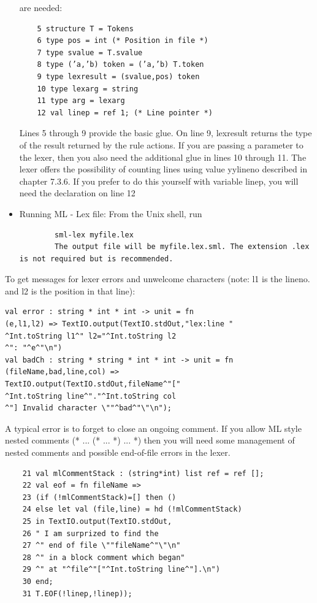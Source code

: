 \documentclass[8pt, a4paper, oneside, twocolumn]{extarticle}
\begin{document}
\begin{itemize}
    are needed:
    \begin{verbatim}
    5 structure T = Tokens
    6 type pos = int (* Position in file *)
    7 type svalue = T.svalue
    8 type (’a,’b) token = (’a,’b) T.token
    9 type lexresult = (svalue,pos) token
    10 type lexarg = string
    11 type arg = lexarg
    12 val linep = ref 1; (* Line pointer *)
    \end{verbatim}
    Lines 5 through 9 provide the basic glue. On line 9, lexresult returns the type of the
result returned by the rule actions.
If you are passing a parameter to the lexer, then you also need the additional glue
in lines 10 through 11. The lexer offers the possibility of counting lines using value yylineno described in
chapter 7.3.6. If you prefer to do this yourself with variable linep, you will need the
declaration on line 12
    \item Running ML - Lex file: From the Unix shell, run \begin{verbatim} 
        sml-lex myfile.lex 
        The output file will be myfile.lex.sml. The extension .lex is not required but is recommended. 
    \end{verbatim}
\end{itemize}

To get messages for lexer errors and unwelcome characters (note: l1 is the lineno. and l2 is the position in that line):
\begin{verbatim}
val error : string * int * int -> unit = fn
(e,l1,l2) => TextIO.output(TextIO.stdOut,"lex:line "
^Int.toString l1^" l2="^Int.toString l2
^": "^e^"\n")
val badCh : string * string * int * int -> unit = fn
(fileName,bad,line,col) =>
TextIO.output(TextIO.stdOut,fileName^"["
^Int.toString line^"."^Int.toString col
^"] Invalid character \""^bad^"\"\n");
\end{verbatim}

A typical error is to
forget to close an ongoing comment. If you allow ML style nested comments (* ... (*
... *) ... *) then you will need some management of nested comments and possible
end-of-file errors in the lexer. 
\begin{verbatim}
    21 val mlCommentStack : (string*int) list ref = ref [];
    22 val eof = fn fileName =>
    23 (if (!mlCommentStack)=[] then ()
    24 else let val (file,line) = hd (!mlCommentStack)
    25 in TextIO.output(TextIO.stdOut,
    26 " I am surprized to find the
    27 ^" end of file \""fileName^"\"\n"
    28 ^" in a block comment which began"
    29 ^" at "^file^"["^Int.toString line^"].\n")
    30 end;
    31 T.EOF(!linep,!linep));
\end{verbatim}
\end{document}

